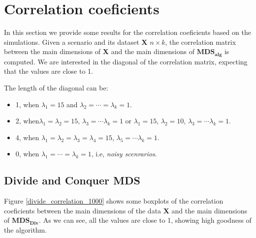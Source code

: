 \documentclass[11pt]{report}
\begin{document}
\section{Correlation coeficients}
In this section we provide some results for the correlation coeficients based
on the simulations. Given a scenario and its dataset \textbf{X} 
$n \times k$, the correlation matrix between the main dimensions of \textbf{X} 
and the main dimensions of $\mathbf{MDS_{alg}}$ is computed. We are interested
in the diagonal of the correlation matrix, expecting that the values are close
to 1.

\indent The length of the diagonal can be:

\begin{itemize}
\item 1, when  $\lambda_1 = 15$ and $\lambda_2 = \cdots = \lambda_k = 1$.

\item 2, when$\lambda_1  = \lambda_2 = 15$, $\lambda_3 = \cdots \lambda_k = 1$
or $\lambda_1  = 15$, $\lambda_2 =10$, $\lambda_3 = \cdots \lambda_k = 1$.

\item 4, when $\lambda_1  = \lambda_2 = \lambda_3 = \lambda_4 = 15$, 
$\lambda_5 = \cdots \lambda_k = 1$.

\item 0, when $\lambda_1 = \cdots = \lambda_k = 1$, i.e, 
\textit{noisy scenrarios}.

\end{itemize}


\subsection{Divide and Conquer MDS}
Figure \ref{divide_correlation_1000} shows some boxplots of the correlation 
coeficients between the main dimensions of the data \textbf{X} and the 
main dimensions of $\mathbf{MDS_{Div}}$. As we can see, all the values are 
close to 1, showing high goodness of the algorithm. 
\end{document}
